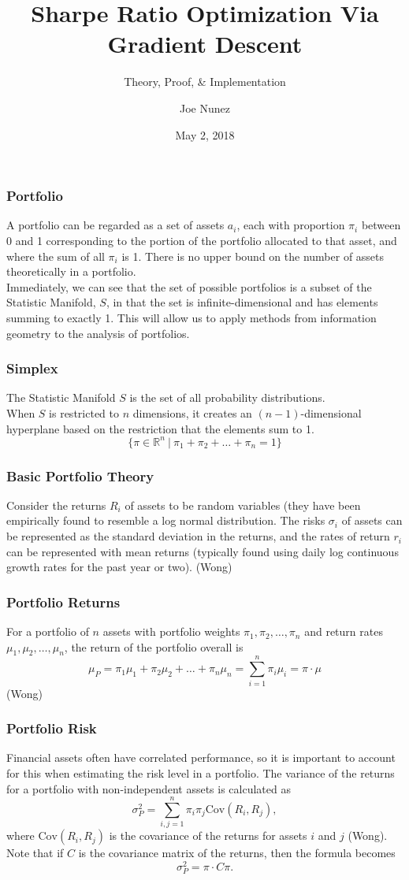 \documentclass{beamer}
\title{Sharpe Ratio Optimization Via Gradient Descent}
\subtitle{Theory, Proof, \& Implementation}
\author{Joe Nunez}
\institute{Harvey Mudd College}
\date{May 2, 2018}
\begin{document}
\begin{frame}
\titlepage
\end{frame}


\begin{frame}
\frametitle{Portfolio}
A portfolio can be regarded as a set of assets $a_i$, each with proportion $\pi_i$ between 0 and 1 corresponding to the portion of the portfolio allocated to that asset, and where the sum of all $\pi_i$ is 1.  There is no upper bound on the number of assets theoretically in a portfolio.
\vspace{.1in}
\\Immediately, we can see that the set of possible portfolios is a subset of the Statistic Manifold, $S$, in that the set is infinite-dimensional and has elements summing to exactly 1.  This will allow us to apply methods from information geometry to the analysis of portfolios.
\end{frame}

\begin{frame}
\frametitle{Simplex}
The Statistic Manifold $S$ is the set of all probability distributions.
\\When $S$ is restricted to $n$ dimensions, it creates an $(n-1)$-dimensional hyperplane based on the restriction that the elements sum to 1. 
\[\{ \pi \in \mathbb{R}^n\ |\ \pi_1 + \pi_2 + \dots +\pi_n = 1\}\]
\end{frame}

\begin{frame}
\frametitle{Basic Portfolio Theory}
Consider the returns $R_i$ of assets to be random variables (they have been empirically found to resemble a log normal distribution.  The risks $\sigma_i$ of assets can be represented as the standard deviation in the returns, and the rates of return $r_i$ can be represented with mean returns (typically found using daily log continuous growth rates for the past year or two).  (Wong)
\end{frame}

\begin{frame}
\frametitle{Portfolio Returns}
For a portfolio of $n$ assets with portfolio weights $\pi_1, \pi_2, \dots, \pi_n$ and return rates $\mu_1, \mu_2, \dots, \mu_n$, the return of the portfolio overall is 
\[\mu_P = \pi_1\mu_1 +\pi_2\mu_2 + \dots + \pi_n \mu_n = \sum_{i=1}^n \pi_i \mu_i = \pi \cdot \mu \]
(Wong)
\end{frame}

\begin{frame}
\frametitle{Portfolio Risk}
Financial assets often have correlated performance, so it is important to account for this when estimating the risk level in a portfolio.  The variance of the returns for a portfolio with non-independent assets is calculated as
\[\sigma^2_P = \sum_{i,j=1}^n \pi_i \pi_j \text{Cov} (R_i, R_j),\]
where $\text{Cov} (R_i, R_j)$ is the covariance of the returns for assets $i$ and $j$ (Wong).  Note that if $C$ is the covariance matrix of the returns, then the formula becomes 
\[\sigma_P^2 = \pi \cdot C \pi.\]
\end{frame}
\end{document}
